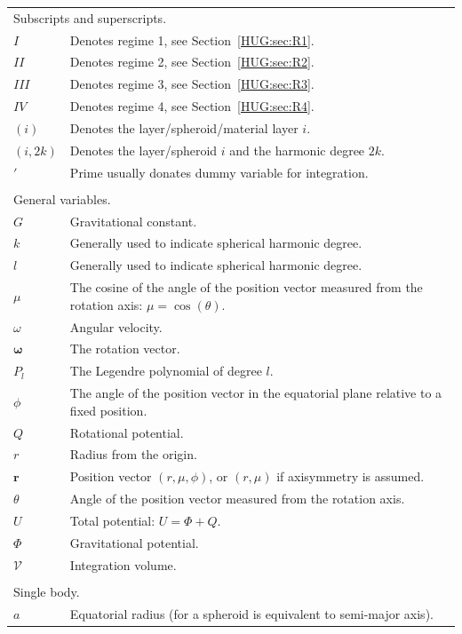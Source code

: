 \documentclass[11pt, oneside]{article}   	%
\renewcommand{\vec}[1]{\bm{#1}}
\begin{document}
\begin{longtable}{l p{12cm}}
\multicolumn{2}{l}{Subscripts and superscripts.} \\
$I$ & Denotes regime 1, see Section~\ref{HUG:sec:R1}. \\
$II$ & Denotes regime 2, see Section~\ref{HUG:sec:R2}. \\
$III$ & Denotes regime 3, see Section~\ref{HUG:sec:R3}. \\
$IV$ & Denotes regime 4, see Section~\ref{HUG:sec:R4}. \\
$(i)$ & Denotes the layer/spheroid/material layer $i$. \\
$(i, 2k)$ & Denotes the layer/spheroid $i$ and the harmonic degree $2k$. \\
$'$ & Prime usually donates dummy variable for integration. \\
\multicolumn{2}{l}{} \\
\multicolumn{2}{l}{General variables.} \\
$G$ & Gravitational constant. \\
$k$ & Generally used to indicate spherical harmonic degree. \\
$l$ & Generally used to indicate spherical harmonic degree. \\
$\mu$ & The cosine of the angle of the position vector measured from the rotation axis: $\mu = \cos(\theta)$. \\
$\omega$ & Angular velocity. \\
$\vec{\omega}$ & The rotation vector. \\
$P_l$ & The Legendre polynomial of degree $l$. \\
$\phi$ & The angle of the position vector in the equatorial plane relative to a fixed position. \\
$Q$ & Rotational potential. \\
$r$ & Radius from the origin. \\
$\vec{r}$ & Position vector $(r, \mu, \phi)$, or $(r, \mu)$ if axisymmetry is assumed. \\
$\theta$ & Angle of the position vector measured from the rotation axis. \\
$U$ & Total potential: $U=\Phi+Q$. \\
$\Phi$ & Gravitational potential. \\
$\mathcal{V}$ & Integration volume. \\
\multicolumn{2}{l}{} \\
\multicolumn{2}{l}{Single body.} \\
$a$ & Equatorial radius (for a spheroid is equivalent to semi-major axis). \\

\end{longtable}
\end{document}
